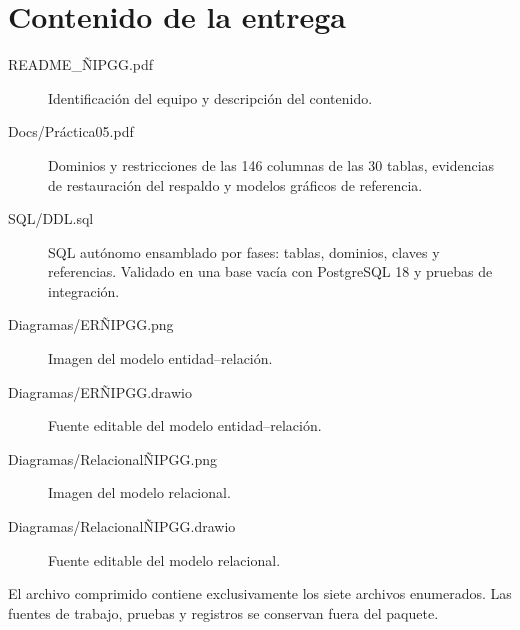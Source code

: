 \documentclass[11pt]{article}
\begin{document}
\section*{Contenido de la entrega}
\begin{description}
\item[README\_ÑIPGG.pdf] Identificación del equipo y descripción del contenido.
\item[Docs/Práctica05.pdf] Dominios y restricciones de las 146 columnas de las 30 tablas,
  evidencias de restauración del respaldo y modelos gráficos de referencia.
\item[SQL/DDL.sql] SQL autónomo ensamblado por fases: tablas, dominios,
  claves y referencias. Validado en una base vacía con PostgreSQL 18 y pruebas de integración.
\item[Diagramas/ERÑIPGG.png] Imagen del modelo entidad--relación.
\item[Diagramas/ERÑIPGG.drawio] Fuente editable del modelo entidad--relación.
\item[Diagramas/RelacionalÑIPGG.png] Imagen del modelo relacional.
\item[Diagramas/RelacionalÑIPGG.drawio] Fuente editable del modelo relacional.
\end{description}
El archivo comprimido contiene exclusivamente
los siete archivos enumerados. Las fuentes de trabajo, pruebas y registros
se conservan fuera del paquete.
\end{document}
